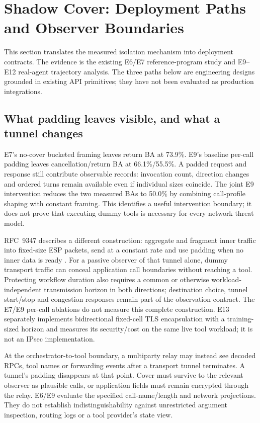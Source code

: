 \section{Shadow Cover: Deployment Paths and Observer Boundaries}\label{sec:shadow-deployment}
This section translates the measured isolation mechanism into deployment contracts. The evidence is the existing E6/E7 reference-program study and E9--E12 real-agent trajectory analysis. The three paths below are engineering designs grounded in existing API primitives; they have not been evaluated as production integrations.

\subsection{What padding leaves visible, and what a tunnel changes}
E7's no-cover bucketed framing leaves return BA at 73.9\%. E9's baseline per-call padding leaves cancellation/return BA at 66.1\%/55.5\%. A padded request and response still contribute observable records: invocation count, direction changes and ordered turns remain available even if individual sizes coincide. The joint E9 intervention reduces the two measured BAs to 50.0\% by combining call-profile shaping with constant framing. This identifies a useful intervention boundary; it does not prove that executing dummy tools is necessary for every network threat model.

RFC~9347 describes a different construction: aggregate and fragment inner traffic into fixed-size ESP packets, send at a constant rate and use padding when no inner data is ready \cite{rfc9347}. For a passive observer of that tunnel alone, dummy transport traffic can conceal application call boundaries without reaching a tool. Protecting workflow duration also requires a common or otherwise workload-independent transmission horizon in both directions; destination choice, tunnel start/stop and congestion responses remain part of the observation contract. The E7/E9 per-call ablations do not measure this complete construction. E13 separately implements bidirectional fixed-cell TLS encapsulation with a training-sized horizon and measures its security/cost on the same live tool workload; it is not an IPsec implementation.

At the orchestrator-to-tool boundary, a multiparty relay may instead see decoded RPCs, tool names or forwarding events after a transport tunnel terminates. A tunnel's padding disappears at that point. Cover must survive to the relevant observer as plausible calls, or application fields must remain encrypted through the relay. E6/E9 evaluate the specified call-name/length and network projections. They do not establish indistinguishability against unrestricted argument inspection, routing logs or a tool provider's state view.

